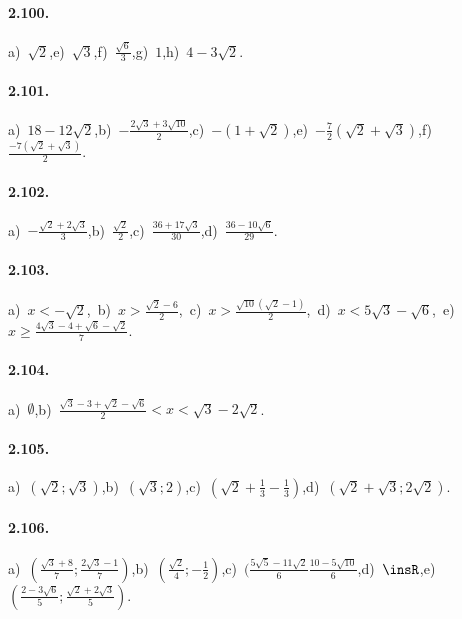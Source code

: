 \paragraph{2.100.}
a)~$\sqrt{2}$,\quad e)~$\sqrt{3}$,\quad f)~$\frac{\sqrt 6} 3$,\quad g)~$1$,\quad h)~$4-3\sqrt 2$.

\paragraph{2.101.}
a)~$18-12\sqrt 2$,\quad b)~$-\frac{2\sqrt 3+3\sqrt{10}} 2$,\quad c)~$-(1+\sqrt 2)$,\quad e)~$-\frac{7}{2}(\sqrt{2}+\sqrt{3})$,\quad f)~$\frac{-7(\sqrt 2+\sqrt 3)} 2$.

\paragraph{2.102.}
a)~$-\frac{\sqrt 2+2\sqrt 3} 3$,\quad b)~$\frac{\sqrt 2} 2$,\quad c)~$\frac{36+17\sqrt 3}{30}$,\quad d)~$\frac{36-10\sqrt 6}{29}$.

\paragraph{2.103.}
a)~$x<-\sqrt 2$,\, b)~$x>\frac{\sqrt 2-6} 2$,\, c)~$x>\frac{\sqrt{10}(\sqrt 2-1)} 2$,\, d)~$x<5\sqrt 3-\sqrt 6$,\, e)~$x\ge \frac{4\sqrt 3-4+\sqrt 6-\sqrt 2} 7$.

\paragraph{2.104.}
a)~$\emptyset$,\quad b)~$\frac{\sqrt 3-3+\sqrt 2-\sqrt 6} 2<x<\sqrt 3-2\sqrt 2$.

\paragraph{2.105.}
a)~$(\sqrt 2;\sqrt 3)$,\quad b)~$(\sqrt 3;2)$,\quad c)~$(\sqrt 2+\frac 1 3-\frac 1 3)$,\quad d)~$(\sqrt 2+\sqrt 3;2\sqrt 2)$.

\paragraph{2.106.}
a)~$(\frac{\sqrt 3+8} 7;\frac{2\sqrt 3-1} 7)$,\quad b)~$(\frac{\sqrt 2} 4;-\frac 1 2)$,\quad c)~$(\frac{5\sqrt 5-11\sqrt 2} 6\frac{10-5\sqrt{10}} 6$,\quad d)~$\insR$,\quad e)~$(\frac{2-3\sqrt 6} 5; \frac{\sqrt 2+2\sqrt 3} 5)$.

